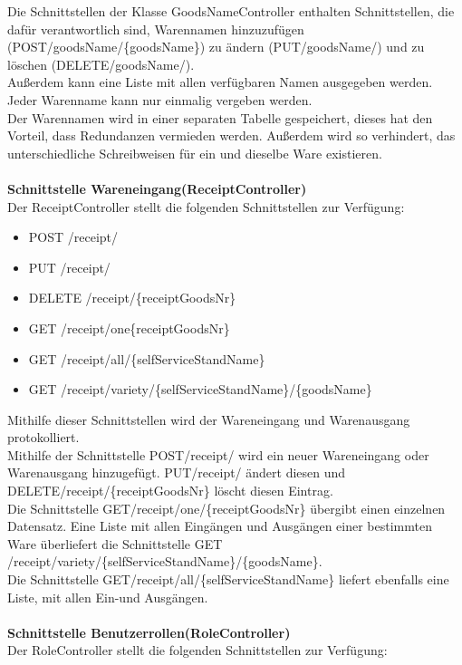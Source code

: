 Die Schnittstellen der Klasse GoodsNameController enthalten Schnittstellen, die dafür verantwortlich sind, Warennamen hinzuzufügen (POST/goodsName/\{goodsName\}) zu ändern (PUT/goodsName/) und zu löschen (DELETE/goodsName/).\\ Außerdem kann eine Liste mit allen verfügbaren Namen ausgegeben werden.
Jeder Warenname kann nur einmalig vergeben werden. \\
Der Warennamen wird in einer separaten Tabelle gespeichert, dieses hat den Vorteil, dass Redundanzen vermieden werden. Außerdem wird so verhindert, das unterschiedliche Schreibweisen für ein und dieselbe Ware existieren.
\\
\\
\textbf{Schnittstelle Wareneingang(ReceiptController)}
\\
Der ReceiptController stellt die folgenden Schnittstellen zur Verfügung:

\begin{itemize}
	\itemsep0pt
	\item  POST /receipt/
	\item  PUT /receipt/
	\item  DELETE /receipt/\{receiptGoodsNr\}
	\item  GET /receipt/one\{receiptGoodsNr\}
	\item  GET /receipt/all/\{selfServiceStandName\}
	\item  GET /receipt/variety/\{selfServiceStandName\}/\{goodsName\}
\end{itemize}

Mithilfe dieser Schnittstellen wird der Wareneingang und Warenausgang protokolliert.\\
Mithilfe der Schnittstelle POST/receipt/ wird ein neuer Wareneingang oder Warenausgang hinzugefügt. PUT/receipt/ ändert diesen und DELETE/receipt/\{receiptGoodsNr\} löscht diesen Eintrag.\\
Die Schnittstelle GET/receipt/one/\{receiptGoodsNr\} übergibt einen einzelnen Datensatz. Eine Liste mit allen Eingängen und Ausgängen einer bestimmten Ware überliefert die Schnittstelle GET /receipt/variety/\{selfServiceStandName\}/\{goodsName\}.
\\
Die Schnittstelle GET/receipt/all/\{selfServiceStandName\} liefert ebenfalls eine Liste, mit allen Ein-und Ausgängen.
\\
\\
\textbf{Schnittstelle Benutzerrollen(RoleController)}
\\
Der RoleController stellt die folgenden Schnittstellen zur Verfügung:

